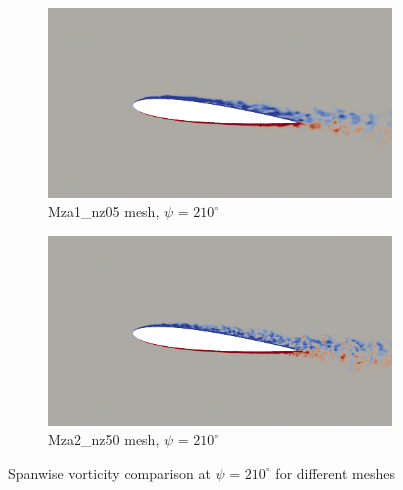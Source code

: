 \begin{figure}[H]
	\begin{subfigure}[b]{0.6\textwidth}
		\centering
		\includegraphics[width=1\textwidth]{figures/zonal_adapt_results/vorticity_plots_Re200k/Mza1_50/phase_210.png}
		\caption{Mza1\_nz05 mesh, $\psi$ = $210^\circ$}
		\label{fig:Mza1_50_Re200k_sp_psi210}
	\end{subfigure}
	\begin{subfigure}[b]{0.6\textwidth}
		\centering
		\includegraphics[width=1\textwidth]{figures/zonal_adapt_results/vorticity_plots_Re200k/Mza2_50/phase_210.png}
		\caption{Mza2\_nz50 mesh, $\psi$ = $210^\circ$}
		\label{fig:Mza2_50_Re200k_sp_psi210}
	\end{subfigure}	
	\caption{Spanwise vorticity comparison at $\psi$ = $210^\circ$ for different meshes}
	\label{fig:vorticity_Re200k_sp_210}
\end{figure}



